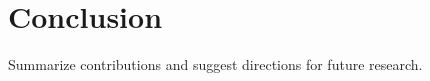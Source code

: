 \chapter{Conclusion}
\label{ch:conclusion}

Summarize contributions and suggest directions for future research.
